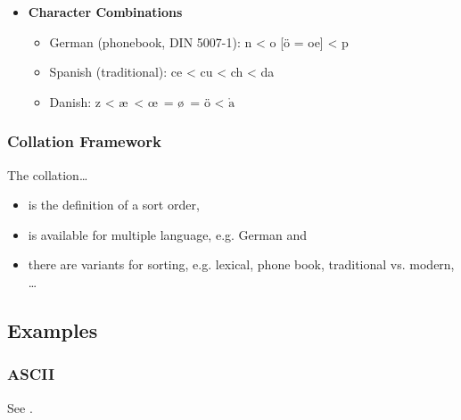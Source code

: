 \begin{itemize}
\begin{itemize}
                			\item French: c{\^o}te < cot{\'e}
                			\item English: cot{\'e} < c{\^o}te
                		\end{itemize}
                	\item \textbf{Character Combinations}
                		\begin{itemize}
                			\item German (phonebook, DIN 5007-1): n < o [ö = oe] < p
                			\item Spanish (traditional): ce < cu < ch < da
                			\item Danish: z < \ae \, < \! \oe \, = \o \, = ö < \(\mathring{\text{a}}\)
                		\end{itemize}
                \end{itemize}

            \subsubsection{Collation Framework} %
            	The collation\dots
                \begin{itemize}
                	\item is the definition of a sort order,
                	\item is available for multiple language, e.g. German and
                	\item there are variants for sorting, e.g. lexical, phone book, traditional vs. modern, \dots
                \end{itemize}

        \subsection{Examples} %
            \subsubsection{ASCII} %
                See .

